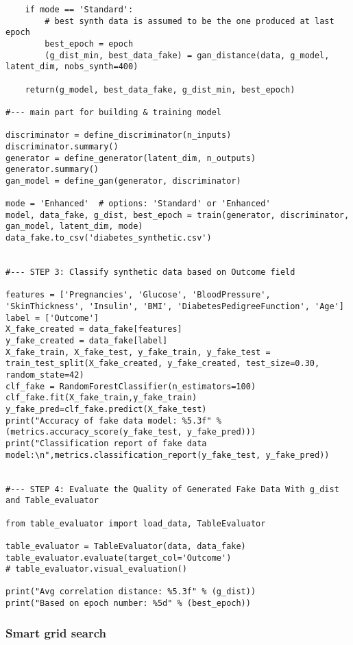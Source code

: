 \documentclass[oneside,10pt]{book}
\begin{document}
\begin{lstlisting}
    if mode == 'Standard':
        # best synth data is assumed to be the one produced at last epoch
        best_epoch = epoch
        (g_dist_min, best_data_fake) = gan_distance(data, g_model, latent_dim, nobs_synth=400)
       
    return(g_model, best_data_fake, g_dist_min, best_epoch) 

#--- main part for building & training model

discriminator = define_discriminator(n_inputs)
discriminator.summary()
generator = define_generator(latent_dim, n_outputs)
generator.summary()
gan_model = define_gan(generator, discriminator)

mode = 'Enhanced'  # options: 'Standard' or 'Enhanced'
model, data_fake, g_dist, best_epoch = train(generator, discriminator, gan_model, latent_dim, mode)
data_fake.to_csv('diabetes_synthetic.csv') 
    

#--- STEP 3: Classify synthetic data based on Outcome field

features = ['Pregnancies', 'Glucose', 'BloodPressure', 'SkinThickness', 'Insulin', 'BMI', 'DiabetesPedigreeFunction', 'Age']
label = ['Outcome']
X_fake_created = data_fake[features]
y_fake_created = data_fake[label]
X_fake_train, X_fake_test, y_fake_train, y_fake_test = train_test_split(X_fake_created, y_fake_created, test_size=0.30, random_state=42)
clf_fake = RandomForestClassifier(n_estimators=100)
clf_fake.fit(X_fake_train,y_fake_train)
y_fake_pred=clf_fake.predict(X_fake_test)
print("Accuracy of fake data model: %5.3f" % (metrics.accuracy_score(y_fake_test, y_fake_pred)))
print("Classification report of fake data model:\n",metrics.classification_report(y_fake_test, y_fake_pred))


#--- STEP 4: Evaluate the Quality of Generated Fake Data With g_dist and Table_evaluator

from table_evaluator import load_data, TableEvaluator

table_evaluator = TableEvaluator(data, data_fake)
table_evaluator.evaluate(target_col='Outcome')
# table_evaluator.visual_evaluation() 

print("Avg correlation distance: %5.3f" % (g_dist))
print("Based on epoch number: %5d" % (best_epoch))
\end{lstlisting}

\subsubsection{Smart grid search}\label{smartgs}
\end{document}
